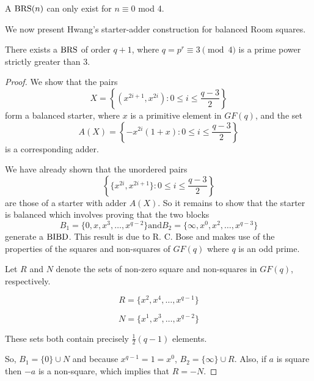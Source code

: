 \begin{corollary}
A $\operatorname{BRS}(n)$ can only exist for $n \equiv 0$ mod 4.
\end{corollary}

We now present Hwang’s starter-adder construction for balanced Room squares.

\begin{theorem}
\label{thm:hwang}
There exists a $\operatorname{BRS}$ of order $q+1$, where $q = p^r \equiv 3\pmod 4$ is a prime power strictly greater than 3.
\end{theorem}

\begin{proof}
We show that the pairs
\begin{equation}
X = \left\{(x^{2i + 1}, x^{2i}): 0 \leq i \leq \frac{q - 3}{2} \right\}
\end{equation}
form a balanced starter, where $x$ is a primitive element in $GF(q)$, and the set
\begin{equation}
A(X) = \left\{-x^{2i}(1 + x): 0 \leq i \leq \frac{q - 3}{2} \right\}
\end{equation}
is a corresponding adder.

We have already shown that the unordered pairs
\begin{equation}
\left\{\{x^{2i}, x^{2i + 1}\}: 0 \leq i \leq \frac{q - 3}{2} \right\}
\end{equation}
are those of a starter with adder $A(X)$.
So it remains to show that the starter is balanced which involves proving that the two blocks
\begin{equation}
B_1 = \{0, x, x^3, \ldots, x^{q - 2}\} \mathrm{and} B_2 = \{\infty, x^0, x^2, \ldots, x^{q - 3}\}
\end{equation}
generate a $\operatorname{BIBD}$.
This result is due to R. C. Bose and makes use of the properties of the squares and non-squares of $GF(q)$ where $q$ is an odd prime.

Let $R$ and $N$ denote the sets of non-zero square and non-squares in $GF(q)$, respectively.

\begin{equation}
R = \{x^2, x^4, \ldots, x^{q - 1}\}
\end{equation}

\begin{equation}
N = \{x^1, x^3, \ldots, x^{q - 2}\}
\end{equation}

These sets both contain precisely $\frac{1}{2}(q - 1)$ elements.

So, $B_1 = \{0\} \cup N$ and because $x^{q - 1} = 1 = x^0$, $B_2 = \{\infty\} \cup R$.
Also, if $a$ is square then $-a$ is a non-square, which implies that $R = -N$.


\end{proof}
